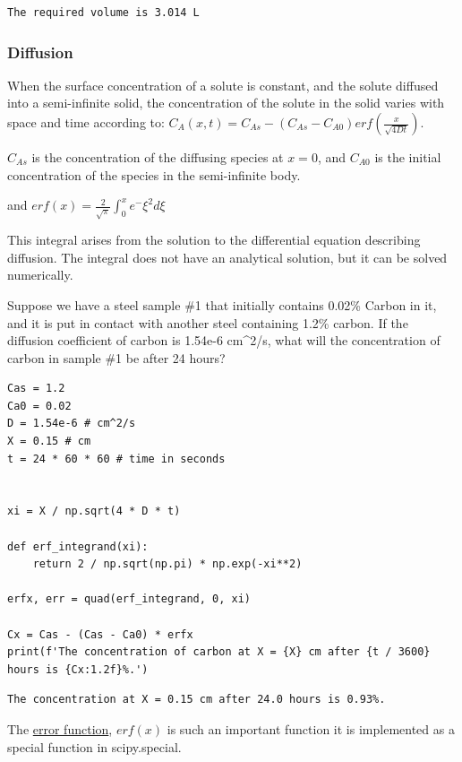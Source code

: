\documentclass[11pt]{article}
\begin{document}
\begin{verbatim}
The required volume is 3.014 L

\end{verbatim}
\subsubsection{Diffusion}
\label{sec:org92ecf54}

When the surface concentration of a solute is constant, and the solute diffused into a semi-infinite solid, the concentration of the solute in the solid varies with space and time according to:
\(C_A(x, t) = C_{As} - (C_{As} - C_{A0}) erf\left(\frac{x}{\sqrt{4 D t}}\right)\).

\(C_{As}\) is the concentration of the diffusing species at \(x=0\), and \(C_{A0}\) is the initial concentration of the species in the semi-infinite body.

and \(erf(x) = \frac{2}{\sqrt{\pi}} \int_0^x e^-{\xi^2} d\xi\)

This integral arises from the solution to the differential equation describing diffusion. The integral does not have an analytical solution, but it can be solved numerically.

Suppose we have a steel sample \#1 that initially contains 0.02\% Carbon in it, and it is put in contact with another steel containing 1.2\% carbon. If the diffusion coefficient of carbon is 1.54e-6 cm\^{}2/s, what will the concentration of carbon in sample \#1 be after 24 hours?

\begin{verbatim}
Cas = 1.2
Ca0 = 0.02
D = 1.54e-6 # cm^2/s
X = 0.15 # cm
t = 24 * 60 * 60 # time in seconds


xi = X / np.sqrt(4 * D * t)

def erf_integrand(xi):
    return 2 / np.sqrt(np.pi) * np.exp(-xi**2)

erfx, err = quad(erf_integrand, 0, xi)

Cx = Cas - (Cas - Ca0) * erfx
print(f'The concentration of carbon at X = {X} cm after {t / 3600} hours is {Cx:1.2f}%.')
\end{verbatim}

\begin{verbatim}
The concentration at X = 0.15 cm after 24.0 hours is 0.93%.

\end{verbatim}

The \href{https://en.wikipedia.org/wiki/Error\_function}{error function}, \(erf(x)\) is such an important function it is implemented as a special function in scipy.special.
\end{document}
